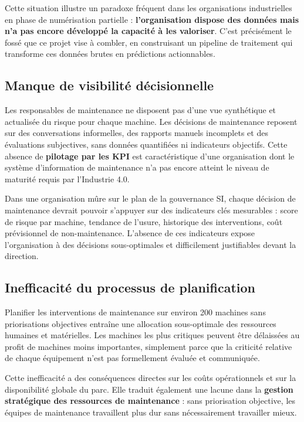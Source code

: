 \documentclass[a4paper,12pt]{report}
\begin{document}
Cette situation illustre un paradoxe fréquent dans les organisations industrielles en phase de numérisation partielle : \textbf{l'organisation dispose des données mais n'a pas encore développé la capacité à les valoriser}. C'est précisément le fossé que ce projet vise à combler, en construisant un pipeline de traitement qui transforme ces données brutes en prédictions actionnables.

\subsection{Manque de visibilité décisionnelle}

Les responsables de maintenance ne disposent pas d'une vue synthétique et actualisée du risque pour chaque machine. Les décisions de maintenance reposent sur des conversations informelles, des rapports manuels incomplets et des évaluations subjectives, sans données quantifiées ni indicateurs objectifs. Cette absence de \textbf{pilotage par les KPI} est caractéristique d'une organisation dont le système d'information de maintenance n'a pas encore atteint le niveau de maturité requis par l'Industrie 4.0.

Dans une organisation mûre sur le plan de la gouvernance SI, chaque décision de maintenance devrait pouvoir s'appuyer sur des indicateurs clés mesurables : score de risque par machine, tendance de l'usure, historique des interventions, coût prévisionnel de non-maintenance. L'absence de ces indicateurs expose l'organisation à des décisions sous-optimales et difficilement justifiables devant la direction.

\subsection{Inefficacité du processus de planification}

Planifier les interventions de maintenance sur environ 200 machines sans priorisations objectives entraîne une allocation sous-optimale des ressources humaines et matérielles. Les machines les plus critiques peuvent être délaissées au profit de machines moins importantes, simplement parce que la criticité relative de chaque équipement n'est pas formellement évaluée et communiquée.

Cette inefficacité a des conséquences directes sur les coûts opérationnels et sur la disponibilité globale du parc. Elle traduit également une lacune dans la \textbf{gestion stratégique des ressources de maintenance} : sans priorisation objective, les équipes de maintenance travaillent plus dur sans nécessairement travailler mieux.
\end{document}
